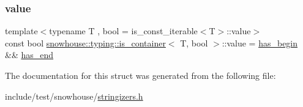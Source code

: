 \mbox{\label{structsnowhouse_1_1typing_1_1is__container_af4b583adec893534a9d15f7887856102}} 
\subsubsection{\texorpdfstring{value}{value}}
{\footnotesize\ttfamily template$<$typename T , bool  = is\+\_\+const\+\_\+iterable$<$\+T$>$\+::value$>$ \\
const bool \mbox{\hyperlink{structsnowhouse_1_1typing_1_1is__container}{snowhouse\+::typing\+::is\+\_\+container}}$<$ T, bool $>$\+::value = \mbox{\hyperlink{structsnowhouse_1_1typing_1_1is__container_a91debdf371b7a26c649f1fba5f5c3e9c}{has\+\_\+begin}} \&\& \mbox{\hyperlink{structsnowhouse_1_1typing_1_1is__container_a3508fcf59d54260c3287f8cb00db3ee8}{has\+\_\+end}}\hspace{0.3cm}{\ttfamily [static]}}



The documentation for this struct was generated from the following file\+:\begin{DoxyCompactItemize}
\item 
include/test/snowhouse/\mbox{\hyperlink{stringizers_8h}{stringizers.\+h}}\end{DoxyCompactItemize}
